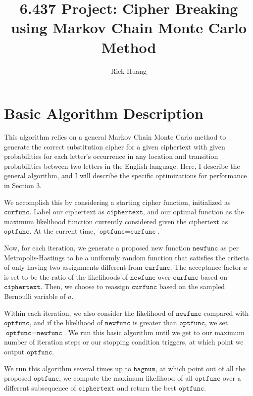 \documentclass[11pt]{paper}
\title{ 
\vspace{-7ex}
6.437 Project: Cipher Breaking using Markov Chain Monte Carlo Method \\ %
}
\author{
Rick Huang
}
\numberwithin{equation}{section} %
\numberwithin{figure}{section} %
\numberwithin{table}{section} %
\begin{document}
\maketitle

\linespread{1.5}

\section{Basic Algorithm Description}

This algorithm relies on a general Markov Chain Monte Carlo method to generate the correct substitution cipher for a given ciphertext with given probabilities for each letter's occurrence in any location and transition probabilities between two letters in the English language. Here, I describe the general algorithm, and I will describe the specific optimizations for performance in Section 3.

\medskip

We accomplish this by considering a starting cipher function, initialized as $\texttt{curfunc}$. Label our ciphertext as $\texttt{ciphertext}$, and our optimal function as the maximum likelihood function currently considered given the ciphertext as $\texttt{optfunc}$. At the current time, $\texttt{optfunc} = \texttt{curfunc}$.

\medskip

Now, for each iteration, we generate a proposed new function $\texttt{newfunc}$ as per Metropolis-Hastings to be a uniformly random function that satisfies the criteria of only having two assignments different from $\texttt{curfunc}$. The acceptance factor $a$ is set to be the ratio of the likelihoods of $\texttt{newfunc}$ over $\texttt{curfunc}$ based on $\texttt{ciphertext}$. Then, we choose to reassign $\texttt{curfunc}$ based on the sampled Bernoulli variable of $a$. 

\medskip

Within each iteration, we also consider the likelihood of $\texttt{newfunc}$ compared with $\texttt{optfunc}$, and if the likelihood of $\texttt{newfunc}$ is greater than $\texttt{optfunc}$, we set $\texttt{optfunc} = \texttt{newfunc}$. We run this basic algorithm until we get to our maximum number of iteration steps or our stopping condition triggers, at which point we output $\texttt{optfunc}$.

\medskip

We run this algorithm several times up to $\texttt{bagnum}$, at which point out of all the proposed $\texttt{optfunc}$, we compute the maximum likelihood of all $\texttt{optfunc}$ over a different subsequence of $\texttt{ciphertext}$ and return the best $\texttt{optfunc}$.
\end{document}
